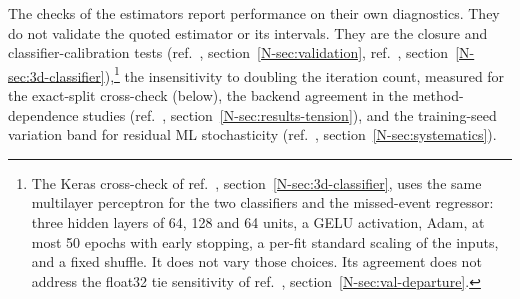 The checks of the estimators report performance on their own diagnostics. They do not validate the quoted estimator or its intervals. They are the closure and classifier-calibration tests (ref.~\cite{AnalysisNote2026}, section~\ref*{N-sec:validation}, ref.~\cite{AnalysisNote2026}, section~\ref*{N-sec:3d-classifier}),\footnote{The Keras cross-check of ref.~\cite{AnalysisNote2026}, section~\ref*{N-sec:3d-classifier}, uses the same multilayer perceptron for the two classifiers and the missed-event regressor: three hidden layers of 64, 128 and 64 units, a GELU activation, Adam, at most 50 epochs with early stopping, a per-fit standard scaling of the inputs, and a fixed shuffle. It does not vary those choices. Its agreement does not address the float32 tie sensitivity of ref.~\cite{AnalysisNote2026}, section~\ref*{N-sec:val-departure}.} the insensitivity to doubling the iteration count, measured for the exact-split cross-check (below), the backend agreement in the method-dependence studies (ref.~\cite{AnalysisNote2026}, section~\ref*{N-sec:results-tension}), and the training-seed variation band for residual ML stochasticity (ref.~\cite{AnalysisNote2026}, section~\ref*{N-sec:systematics}).

